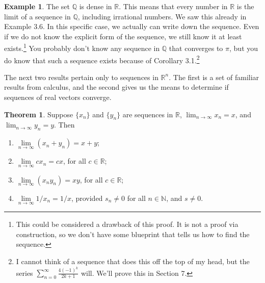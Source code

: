 \documentclass{article}
\newcommand{\N}{\mathbb{N}}
\newcommand{\R}{\mathbb{R}}
\newcommand{\Q}{\mathbb{Q}}
\theoremstyle{definition}
\newtheorem{theorem}{Theorem}[section]
\newtheorem{example}{Example}[section]
\begin{document}
\begin{example}
	The set $ \Q $ is dense in $ \R $. This means that every number in $ \R $ is the limit of a sequence in $ \Q $, including irrational numbers. We saw this already in Example 3.6. In this specific case, we actually can write down the sequence. Even if we do not know the explicit form of the sequence, we still know it at least exists.\footnote{This could be considered a drawback of this proof. It is not a proof via construction, so we don't have some blueprint that tells us how to find the sequence.} You probably don't know any sequence in $ \Q $ that converges to $ \pi $, but you do know that such a sequence exists because of Corollary 3.1.\footnote{I cannot think of a sequence that does this off the top of my head, but the series $ \sum_{n=0}^{\infty}\frac{4(-1)^k}{2k+1} $ will. We'll prove this in Section 7.} 
\end{example}
The next two results pertain only to sequences in $ \R^n $. The first is a set of familiar results from calculus, and the second gives us the means to determine if sequences of real vectors converge. 
\begin{theorem}
	Suppose $ \{x_n\} $ and $ \{y_n\} $ are sequences in $ \R $, $ \lim_{n\to\infty}x_n=x $, and $ \lim_{n\to\infty}y_n=y $. Then
	\begin{enumerate}
		\item $ \lim\limits_{n\to\infty}(x_n+y_n)=x+y $;  
		\item $ \lim\limits_{n\to\infty}cx_n=cx $, for all $ c\in\R $; 
		\item $ \lim\limits_{n\to\infty}(x_ny_n)=xy $, for all $ c\in\R $;
		\item $ \lim\limits_{n\to\infty}1/x_n=1/x$, provided $ s_n\neq 0 $ for all $ n\in \N $, and $ s\neq 0 $.
	\end{enumerate}
\end{theorem}
\end{document}
